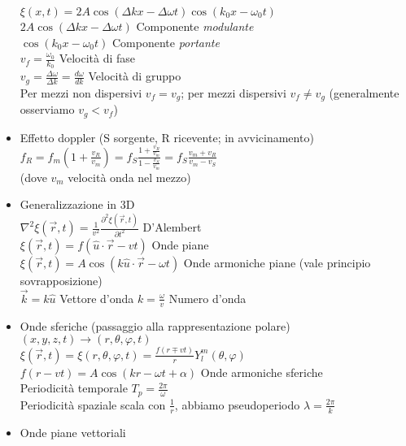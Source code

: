 \documentclass[a4paper]{article}
\begin{document}
\begin{itemize}
 	$\xi(x,t)=2A\cos(\Delta k x-\Delta \omega t)\cos(k_0 x-\omega_0t)$\\
 	$2A\cos(\Delta k x-\Delta \omega t)$ \hspace{0.4cm} Componente \textit{modulante}\\
 	$\cos(k_0 x-\omega_0t)$ \hspace{0.4cm} Componente \textit{portante}\\
 	$v_f=\frac{\omega_0}{k_0}$ \hspace{0.4cm} Velocità di fase\\
 	$v_g=\frac{\Delta \omega}{\Delta k} =\frac{d\omega}{dk}$ \hspace{0.4cm} Velocità di gruppo\\
 	Per mezzi non dispersivi $v_f=v_g$; per mezzi dispersivi $v_f\neq v_g$ (generalmente osserviamo $v_g<v_f$)
 	\item Effetto doppler (S sorgente, R ricevente; in avvicinamento)\\ 
 	$f_R=f_m(1+\frac{v_R}{v_m})=f_S\frac{1+\frac{v_R}{v_m}}{1-\frac{v_S}{v_m}}=f_S \frac{v_m + v_R}{v_m-v_S}$ \\
 	(dove $v_m$ velocità onda nel mezzo)
 	\item Generalizzazione in  3D\\
 	$\nabla^2 \xi(\overrightarrow{r},t)=\frac{1}{v^2}\frac{\partial^2 \xi(\overrightarrow{r},t)}{\partial t^2}$ D'Alembert\\
 	$\xi(\overrightarrow{r},t)=f(\hat{u}  \cdot \overrightarrow{r}-vt)$ Onde piane\\
 	$\xi(\overrightarrow{r},t)=A\cos(k\hat{u}\cdot \overrightarrow{r}-\omega t)$ Onde armoniche piane (vale principio sovrapposizione)\\
 	$\overrightarrow{k}=k \hat{u}$ Vettore d'onda
 	$k=\frac{\omega}{v}$ Numero d'onda
 	\item Onde sferiche (passaggio alla rappresentazione polare) $(x,y,z,t)\rightarrow(r,\theta,\varphi,t)$\\
 	$\xi(\overrightarrow{r},t)=\xi(r,\theta,\varphi,t)=\frac{f(r\mp vt)}{r}Y^m_l(\theta, \varphi)$\\
 	$f(r-vt)=A\cos (kr-\omega t+\alpha)$ Onde armoniche sferiche\\
 	Periodicità temporale $T_p =\frac{2\pi}{\omega}$\\
 	Periodicità spaziale scala con $\frac{1}{r}$, abbiamo pseudoperiodo $\lambda = \frac{2\pi}{k}$\\
 	\item Onde piane vettoriali
 	\begin{equation*}

\end{equation*}
\end{itemize}
\end{document}

